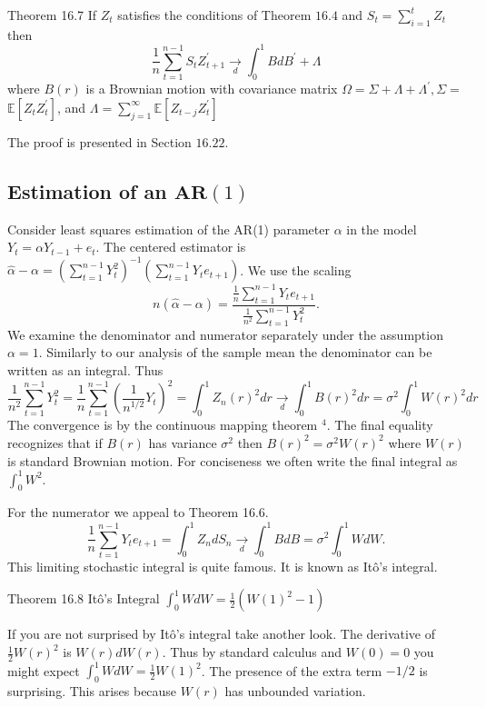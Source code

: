 \documentclass[10pt]{article}
\begin{document}
Theorem 16.7 If $Z_{t}$ satisfies the conditions of Theorem $16.4$ and $S_{t}=\sum_{i=1}^{t} Z_{t}$ then
$$
\frac{1}{n} \sum_{t=1}^{n-1} S_{t} Z_{t+1}^{\prime} \underset{d}{\longrightarrow} \int_{0}^{1} B d B^{\prime}+\Lambda
$$
where $B(r)$ is a Brownian motion with covariance matrix $\Omega=\Sigma+\Lambda+\Lambda^{\prime}, \Sigma=$ $\mathbb{E}\left[Z_{t} Z_{t}^{\prime}\right]$, and $\Lambda=\sum_{j=1}^{\infty} \mathbb{E}\left[Z_{t-j} Z_{t}^{\prime}\right]$

The proof is presented in Section $16.22$.

\subsection{Estimation of an $\mathbf{A R}(1)$}
Consider least squares estimation of the AR(1) parameter $\alpha$ in the model $Y_{t}=\alpha Y_{t-1}+e_{t}$. The centered estimator is $\widehat{\alpha}-\alpha=\left(\sum_{t=1}^{n-1} Y_{t}^{2}\right)^{-1}\left(\sum_{t=1}^{n-1} Y_{t} e_{t+1}\right)$. We use the scaling
$$
n(\widehat{\alpha}-\alpha)=\frac{\frac{1}{n} \sum_{t=1}^{n-1} Y_{t} e_{t+1}}{\frac{1}{n^{2}} \sum_{t=1}^{n-1} Y_{t}^{2}} .
$$
We examine the denominator and numerator separately under the assumption $\alpha=1$. Similarly to our analysis of the sample mean the denominator can be written as an integral. Thus
$$
\frac{1}{n^{2}} \sum_{t=1}^{n-1} Y_{t}^{2}=\frac{1}{n} \sum_{t=1}^{n-1}\left(\frac{1}{n^{1 / 2}} Y_{t}\right)^{2}=\int_{0}^{1} Z_{n}(r)^{2} d r \underset{d}{\longrightarrow} \int_{0}^{1} B(r)^{2} d r=\sigma^{2} \int_{0}^{1} W(r)^{2} d r
$$
The convergence is by the continuous mapping theorem ${ }^{4}$. The final equality recognizes that if $B(r)$ has variance $\sigma^{2}$ then $B(r)^{2}=\sigma^{2} W(r)^{2}$ where $W(r)$ is standard Brownian motion. For conciseness we often write the final integral as $\int_{0}^{1} W^{2}$.

For the numerator we appeal to Theorem 16.6.
$$
\frac{1}{n} \sum_{t=1}^{n-1} Y_{t} e_{t+1}=\int_{0}^{1} Z_{n} d S_{n} \underset{d}{\longrightarrow} \int_{0}^{1} B d B=\sigma^{2} \int_{0}^{1} W d W .
$$
This limiting stochastic integral is quite famous. It is known as Itô's integral.

Theorem 16.8 Itô's Integral $\int_{0}^{1} W d W=\frac{1}{2}\left(W(1)^{2}-1\right)$

If you are not surprised by Itô's integral take another look. The derivative of $\frac{1}{2} W(r)^{2}$ is $W(r) d W(r)$. Thus by standard calculus and $W(0)=0$ you might expect $\int_{0}^{1} W d W=\frac{1}{2} W(1)^{2}$. The presence of the extra term $-1 / 2$ is surprising. This arises because $W(r)$ has unbounded variation.
\end{document}

